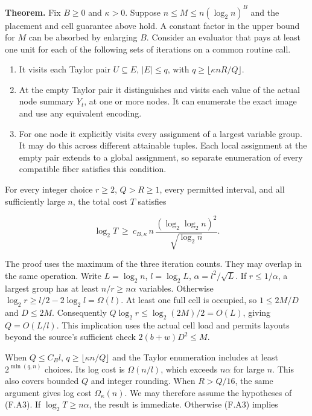 \documentclass[
  11pt,
]{article}
\providecommand{\tightlist}{%
  \setlength{\itemsep}{0pt}\setlength{\parskip}{0pt}}
\begin{document}
\textbf{Theorem.} Fix \(B\ge0\) and \(\kappa>0\). Suppose
\(n\le M\le n(\log_2 n)^B\) and the placement and cell guarantee above
hold. A constant factor in the upper bound for \(M\) can be absorbed by
enlarging \(B\). Consider an evaluator that pays at least one unit for
each of the following sets of iterations on a common routine call.

\begin{enumerate}
\def\labelenumi{\arabic{enumi}.}
\tightlist
\item
  It visits each Taylor pair \(U\subseteq E\), \(|E|\le q\), with
  \(q\ge\lfloor\kappa n R/Q\rfloor\).
\item
  At the empty Taylor pair it distinguishes and visits each value of the
  actual node summary \(Y_t\), at one or more nodes. It can enumerate
  the exact image and use any equivalent encoding.
\item
  For one node it explicitly visits every assignment of a largest
  variable group. It may do this across different attainable tuples.
  Each local assignment at the empty pair extends to a global
  assignment, so separate enumeration of every compatible fiber
  satisfies this condition.
\end{enumerate}

For every integer choice \(r\ge2\), \(Q>R\ge1\), every permitted
interval, and all sufficiently large \(n\), the total cost \(T\)
satisfies

\[
  \log_2 T\ \ge\ c_{B,\kappa}\,n\,\frac{(\log_2\log_2 n)^2}{\sqrt{\log_2 n}}.
  \tag{F.A4}
\]

The proof uses the maximum of the three iteration counts. They may
overlap in the same operation. Write \(L=\log_2 n\), \(l=\log_2 L\),
\(\alpha=l^2/\sqrt L\). If \(r\le1/\alpha\), a largest group has at
least \(n/r\ge n\alpha\) variables. Otherwise
\(\log_2 r\ge l/2-2\log_2 l=\Omega(l)\). At least one full cell is
occupied, so \(1\le 2M/D\) and \(D\le2M\). Consequently
\(Q\log_2 r\le\log_2(2M)/2=O(L)\), giving \(Q=O(L/l)\). This implication
uses the actual cell load and permits layouts beyond the source's
sufficient check \(2(b+w)D^2\le M\).

When \(Q\le C_B l\), \(q\ge\lfloor\kappa n/Q\rfloor\) and the Taylor
enumeration includes at least \(2^{\min(q,n)}\) choices. Its log cost is
\(\Omega(n/l)\), which exceeds \(n\alpha\) for large \(n\). This also
covers bounded \(Q\) and integer rounding. When \(R>Q/16\), the same
argument gives log cost \(\Omega_\kappa(n)\). We may therefore assume
the hypotheses of (F.A3). If \(\log_2T\ge n\alpha\), the result is
immediate. Otherwise (F.A3) implies
\end{document}
